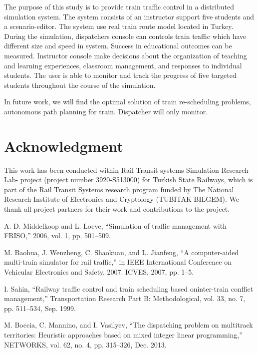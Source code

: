 \documentclass[conference]{IEEEtran}
\begin{document}
The purpose of this study is to provide train traffic control in a distributed simulation system. The system consists of an instructor support five students and a scenario-editor. The system use real train route model located in Turkey.  During the simulation, dispatchers console can controls train traffic which have different  size and speed in system. Success in educational outcomes can be measured. Instructor console make decisions about the organization of teaching and learning experiences, classroom management, and responses to individual students. The user is able to monitor and track the progress of five targeted students throughout the course of the simulation.

In future work, we will find the optimal solution of train re-scheduling problems, autonomous path planning for train. Dispatcher will only monitor. 



\section*{Acknowledgment}


This work has been conducted within Rail Transit systems Simulation Research Lab- project (project number 3920-S513000) for Turkish State Railways, which is part of the Rail Transit Systems research program funded by The National Research Institute of Electronics and Cryptology (TUBITAK BILGEM). We thank all project partners for their work and contributions to the project.

\begin{thebibliography}{1}

A. D. Middelkoop and L. Loeve, “Simulation of traffic management with FRISO,” 2006, vol. 1, pp. 501–509.

M. Baohua, J. Wenzheng, C. Shaokuan, and L. Jianfeng, “A computer-aided multi-train simulator for rail traffic,” in IEEE International Conference on Vehicular Electronics and Safety, 2007. ICVES, 2007, pp. 1–5.

 I. Sahin, “Railway traffic control and train scheduling based oninter-train conflict management,” Transportation Research Part B: Methodological, vol. 33, no. 7, pp. 511–534, Sep. 1999.
 
M. Boccia, C. Mannino, and I. Vasilyev, “The dispatching problem on multitrack territories: Heuristic approaches based on mixed integer linear programming,” NETWORKS, vol. 62, no. 4, pp. 315–326, Dec. 2013. 
 

\end{thebibliography}




\end{document}
